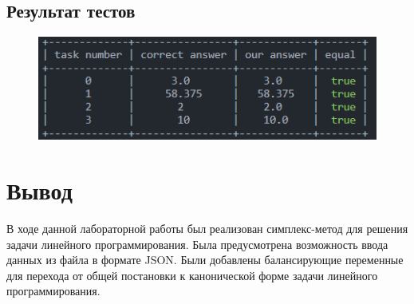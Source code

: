 \documentclass{article}
\begin{document}
\subsection{Результат тестов}

\begin{figure}[H]
    \centering
    \includegraphics [width=1\textwidth]{2023-11-29-22-39-57.png}\\
    \caption{}
\end{figure}


\section{Вывод}

В ходе данной лабораторной работы был реализован симплекс-метод для решения задачи линейного программирования. Была предусмотрена возможность ввода данных из файла в формате JSON. Были добавлены балансирующие переменные для перехода от общей постановки к канонической форме задачи линейного программирования.
\end{document}
